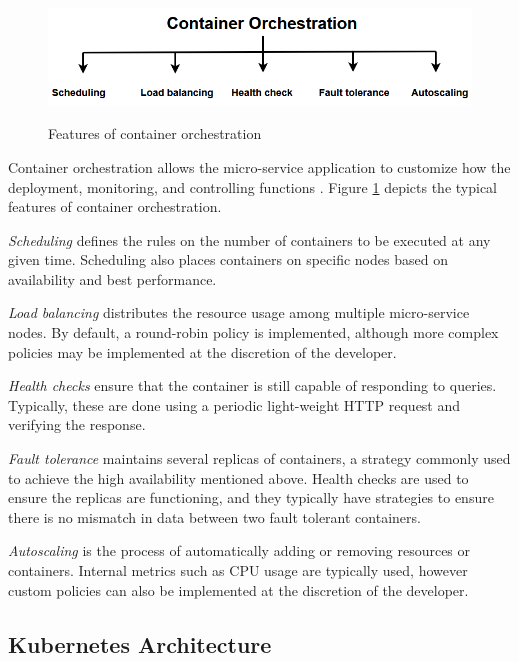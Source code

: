 \begin{figure}[htb]
    \centering
    \caption{Features of container orchestration}
    \includegraphics[width=0.9\linewidth]{Figures/Container-Orchestration.png}
    \label{fig:container-orchestration}
\end{figure}

Container orchestration allows the micro-service application to customize how the deployment, monitoring, and controlling functions \cite{casalicchio2019container}. Figure \ref{fig:container-orchestration} depicts the typical features of container orchestration.\par
\textit{Scheduling} defines the rules on the number of containers to be executed at any given time. Scheduling also places containers on specific nodes based on availability and best performance.\par
\textit{Load balancing} distributes the resource usage among multiple micro-service nodes. By default, a round-robin policy is implemented, although more complex policies may be implemented at the discretion of the developer.\par
\textit{Health checks} ensure that the container is still capable of responding to queries. Typically, these are done using a periodic light-weight HTTP request and verifying the response.\par
\textit{Fault tolerance} maintains several replicas of containers, a strategy commonly used to achieve the high availability mentioned above. Health checks are used to ensure the replicas are functioning, and they typically have strategies to ensure there is no mismatch in data between two fault tolerant containers.\par
\textit{Autoscaling} is the process of automatically adding or removing resources or containers. Internal metrics such as CPU usage are typically used, however custom policies can also be implemented at the discretion of the developer.\par

\subsection{Kubernetes Architecture}
\label{subsec:k8s-overview}

